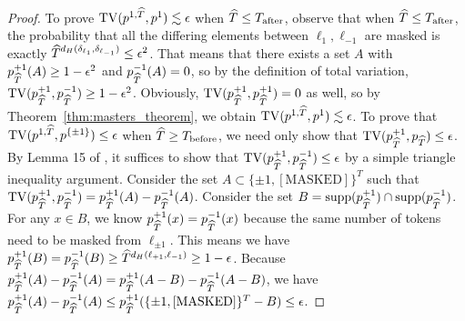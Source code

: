 \randommaskingdirac*
\begin{proof}
To prove $\TV(\modrevlaw{1}{\wh{T}}{},p^{1}) \lesssim \epsilon$ when $\widehat{T} \leq T_{\mathrm{after}}$, observe that when $\widehat{T} \leq T_{\mathrm{after}}$, the probability that all the differing elements between $\ell_1,\ell_{-1}$ are masked is exactly $\widehat{T}^{d_H(\delta_{\ell_{1}},\delta_{\ell_{-1}})}\leq \epsilon^2$. That means that there exists a set $A$ with $p^{+1}_{\widehat{T}}(A) \geq 1-\epsilon^2$ and $p^{-1}_{\widehat{T}}(A)=0$, so by the definition of total variation, $\mathrm{TV}(p^{+1}_{\widehat{T}},p^{-1}_{\widehat{T}})\geq  1- \epsilon^2$. Obviously, $\mathrm{TV}(p^{+1}_{\widehat{T}},p^{+1}_{\widehat{T}})=0$ as well, so by Theorem~\ref{thm:masters_theorem}, we obtain $\TV(\modrevlaw{1}{\wh{T}}{},p^{1}) \lesssim \epsilon$. To prove that $\TV(\modrevlaw{1}{\wh{T}}{},p^{\{\pm 1\}}) \leq \epsilon$ when $\widehat{T} \geq T_{\mathrm{before}}$, we need only show that $\mathrm{TV}(p^{+1}_{\widehat{T}},p_{\widehat{T}}) \leq \epsilon$. By Lemma 15 of \citep{li2024criticalwindowsnonasymptotictheory}, it suffices to show that $\mathrm{TV}(p^{+1}_{\widehat{T}},p^{-1}_{\widehat{T}}) \leq \epsilon$ by a simple triangle inequality argument. Consider the set $A \subset \{\pm 1, \mathrm{[MASKED]}\}^T$ such that $\mathrm{TV}(p^{+1}_{\widehat{T}},p^{-1}_{\widehat{T}})=p^{+1}_{\widehat{T}}(A)-p^{-1}_{\widehat{T}}(A)$. Consider the set $B =\mathrm{supp}(p^{+1}_{\widehat{T}})\cap \mathrm{supp}(p^{-1}_{\widehat{T}})$. For any $x \in B$, we know $p^{+1}_{\widehat{T}}(x)=p^{-1}_{\widehat{T}}(x)$ because the same number of tokens need to be masked from $\ell_{\pm 1}$. This means we have $p^{+1}_{\widehat{T}}(B)=p^{-1}_{\widehat{T}}(B)\geq \widehat{T}^{d_H(\ell_{+1},\ell_{-1})} \geq 1-\epsilon$. Because $p^{+1}_{\widehat{T}}(A)-p^{-1}_{\widehat{T}}(A)=p^{+1}_{\widehat{T}}(A-B)-p^{-1}_{\widehat{T}}(A-B)$, we have $p^{+1}_{\widehat{T}}(A)-p^{-1}_{\widehat{T}}(A) \leq p^{+1}_{\widehat{T}}(\{\pm 1, \mathrm{[MASKED]}\}^T-B) \leq \epsilon$.
\end{proof}


